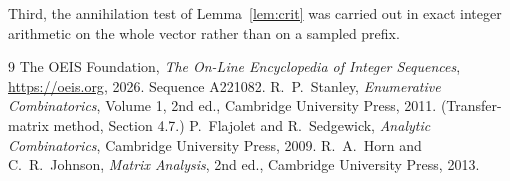 \documentclass[11pt,a4paper]{article}
\theoremstyle{plain}
\theoremstyle{definition}
\begin{document}
Third, the annihilation test of Lemma~\ref{lem:crit} was carried out in exact integer
arithmetic on the whole vector rather than on a sampled prefix.

\begin{thebibliography}{9}
 The OEIS Foundation, \emph{The On-Line Encyclopedia of Integer
Sequences}, \url{https://oeis.org}, 2026. Sequence A221082.
 R.~P.~Stanley, \emph{Enumerative Combinatorics}, Volume 1, 2nd ed.,
Cambridge University Press, 2011. (Transfer-matrix method, Section 4.7.)
 P.~Flajolet and R.~Sedgewick, \emph{Analytic Combinatorics}, Cambridge
University Press, 2009.
 R.~A.~Horn and C.~R.~Johnson, \emph{Matrix Analysis}, 2nd ed., Cambridge
University Press, 2013.
\end{thebibliography}
\end{document}
